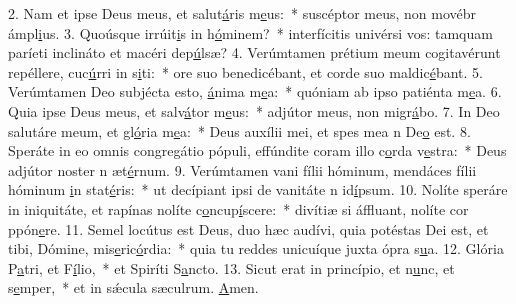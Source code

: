 2. Nam et ipse Deus meus, et salut\uline{á}ris m\uline{e}us:~* suscéptor meus, non movébr ámpl\uline{i}us.
3. Quoúsque irrúit\uline{i}s in h\uline{ó}minem?~* interfícitis univérsi vos: tamquam paríeti inclináto et macéri dep\uline{ú}lsæ?
4. Verúmtamen prétium meum cogitavérunt repéllere, cuc\uline{ú}rri in s\uline{i}ti:~* ore suo benedicébant, et corde suo maldic\uline{é}bant.
5. Verúmtamen Deo subjécta esto, \uline{á}nima m\uline{e}a:~* quóniam ab ipso patiénta m\uline{e}a.
6. Quia ipse Deus meus, et salv\uline{á}tor m\uline{e}us:~* adjútor meus, non migr\uline{á}bo.
7. In Deo salutáre meum, et gl\uline{ó}ria m\uline{e}a:~* Deus auxílii mei, et spes mea n De\uline{o} est.
8. Speráte in eo omnis congregátio pópuli, effúndite coram illo c\uline{o}rda v\uline{e}stra:~* Deus adjútor noster n æt\uline{é}rnum.
9. Verúmtamen vani fílii hóminum, mendáces fílii hóminum \uline{i}n stat\uline{é}ris:~* ut decípiant ipsi de vanitáte n id\uline{í}psum.
10. Nolíte speráre in iniquitáte, et rapínas nolíte c\uline{o}ncup\uline{í}scere:~* divítiæ si áffluant, nolíte cor ppón\uline{e}re.
11. Semel locútus est Deus, duo hæc audívi, quia potéstas Dei est, et tibi, Dómine, mis\uline{e}ric\uline{ó}rdia:~* quia tu reddes unicuíque juxta ópra s\uline{u}a.
12. Glória P\uline{a}tri, et F\uline{í}lio,~* et Spiríti S\uline{a}ncto.
13. Sicut erat in princípio, et n\uline{u}nc, et s\uline{e}mper,~* et in sǽcula sæculrum. \uline{A}men.
